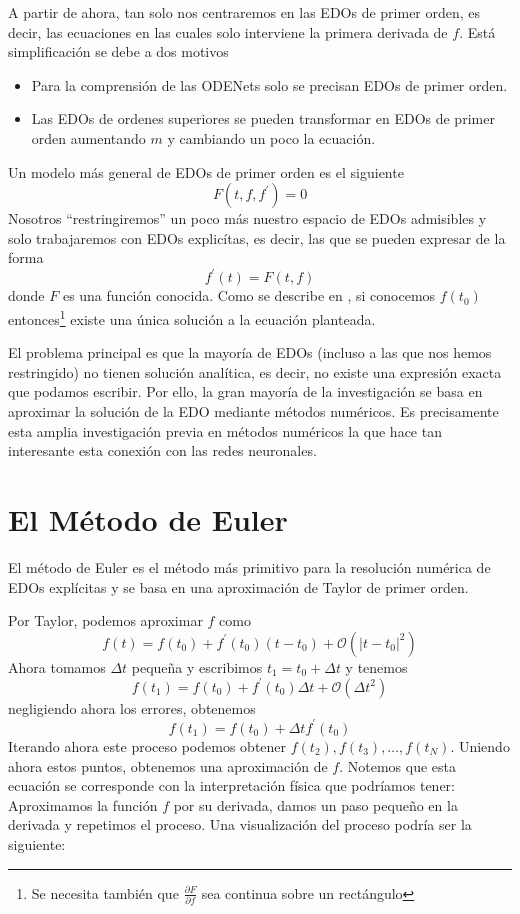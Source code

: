 \documentclass[12pt]{report}
\begin{document}
A partir de ahora, tan solo nos centraremos en las EDOs de primer orden, es
decir, las ecuaciones en las cuales solo interviene la primera derivada de $f$.
Está simplificación se debe a dos motivos
\begin{itemize}
    \item Para la comprensión de las ODENets solo se precisan EDOs de primer
        orden.
    \item Las EDOs de ordenes superiores se pueden transformar en EDOs de primer
        orden aumentando $m$ y cambiando un poco la ecuación.
\end{itemize}

Un modelo más general de EDOs de primer orden es el siguiente
\[
    F(t, f, f^\prime) = 0
\]
Nosotros ``restringiremos'' un poco más nuestro espacio de EDOs admisibles y
solo trabajaremos con EDOs explicítas, es decir, las que se pueden expresar de
la forma
\[
    f^\prime(t) = F(t, f)
\]
donde $F$ es una función conocida. Como se describe en \cite{boyce86}, si
conocemos $f(t_0)$ entonces\footnote{Se necesita también que
$\frac{\partial F}{\partial f}$ sea continua sobre un rectángulo} existe una
única solución a la ecuación planteada.

El problema principal es que la mayoría de EDOs (incluso a las que nos hemos
restringido) no tienen solución analítica, es decir, no existe una expresión
exacta que podamos escribir. Por ello, la gran mayoría de la investigación se
basa en aproximar la solución de la EDO mediante métodos numéricos. Es
precisamente esta amplia investigación previa en métodos numéricos la que hace
tan interesante esta conexión con las redes neuronales.

\section{El Método de Euler}

El método de Euler es el método más primitivo para la resolución numérica de
EDOs explícitas y se basa en una aproximación de Taylor de primer orden.

Por Taylor, podemos aproximar $f$ como
\[
    f(t) = f(t_0) + f^\prime(t_0)(t - t_0) + \mathcal{O}\left( \left|t -
    t_0\right|^2 \right)
\]
Ahora tomamos $\Delta t$ pequeña y escribimos $t_1 = t_0 + \Delta t$ y tenemos
\[
    f(t_1) = f(t_0) + f^\prime(t_0) \Delta t + \mathcal{O}\left( \Delta t^2 \right)
\]
negligiendo ahora los errores, obtenemos
\[
    f(t_1) = f(t_0) + \Delta t f^\prime(t_0)
\]
Iterando ahora este proceso podemos obtener $f(t_2), f(t_3), \dots, f(t_N)$.
Uniendo ahora estos puntos, obtenemos una aproximación de $f$. Notemos que esta
ecuación se corresponde con la interpretación física que podríamos tener:
Aproximamos la función $f$ por su derivada, damos un paso pequeño en la derivada
y repetimos el proceso. Una visualización del proceso podría ser la siguiente:
\end{document}
